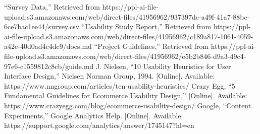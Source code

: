 \documentclass[conference]{IEEEtran}
\begin{document}
\begin{thebibliography}{00}
 ``Survey Data,'' Retrieved from https://ppl-ai-file-upload.s3.amazonaws.com/web/direct-files/41956962/937397dc-a49f-41a7-88bc-6ce7bac1ee44/survey.csv
 ``Usability Study Report,'' Retrieved from https://ppl-ai-file-upload.s3.amazonaws.com/web/direct-files/41956962/c189a817-1061-4059-a42e-40d0ad4c4de9/docs.md
 ``Project Guidelines,'' Retrieved from https://ppl-ai-file-upload.s3.amazonaws.com/web/direct-files/41956962/e5b2b846-d9a3-49c4-97e6-c1559812c8cb/guide.md
 J. Nielsen, ``10 Usability Heuristics for User Interface Design,'' Nielsen Norman Group, 1994. [Online]. Available: https://www.nngroup.com/articles/ten-usability-heuristics/
 Crazy Egg, ``5 Fundamental Guidelines for Ecommerce Usability Design,'' [Online]. Available: https://www.crazyegg.com/blog/ecommerce-usability-design/
 Google, ``Content Experiments,'' Google Analytics Help. [Online]. Available: https://support.google.com/analytics/answer/1745147?hl=en
\end{thebibliography}
\end{document}
